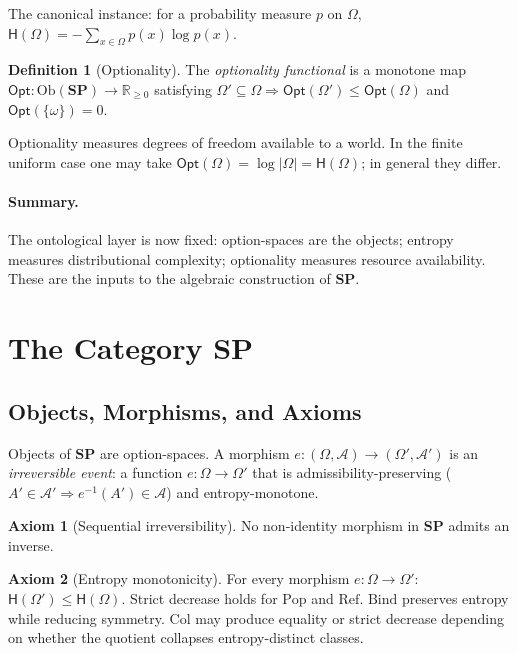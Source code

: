 \documentclass[12pt,a4paper]{article}
\theoremstyle{definition}
\newtheorem{definition}[theorem]{Definition}
\newtheorem{axiom}{Axiom}
\theoremstyle{remark}
\newcommand{\Rnn}{\mathbb{R}_{\ge 0}}
\newcommand{\Ent}{\mathsf{H}}
\newcommand{\Opt}{\mathsf{Opt}}
\newcommand{\SP}{\mathbf{SP}}
\newcommand{\Ob}{\mathrm{Ob}}
\newcommand{\Pop}{\mathrm{Pop}}
\newcommand{\Ref}{\mathrm{Ref}}
\newcommand{\Bind}{\mathrm{Bind}}
\newcommand{\Col}{\mathrm{Col}}
\begin{document}
The canonical instance: for a probability measure $p$ on $\Omega$,
$\Ent(\Omega)=-\sum_{x\in\Omega}p(x)\log p(x)$.

\begin{definition}[Optionality]
\label{def:opt}
The \emph{optionality functional} is a monotone map $\Opt:\Ob(\SP)\to\Rnn$
satisfying $\Omega'\subseteq\Omega\Rightarrow\Opt(\Omega')\le\Opt(\Omega)$ and
$\Opt(\{\omega\})=0$.
\end{definition}

Optionality measures degrees of freedom available to a world. In the finite uniform
case one may take $\Opt(\Omega)=\log|\Omega|=\Ent(\Omega)$; in general they differ.

\paragraph{Summary.} The ontological layer is now fixed: option-spaces are the objects;
entropy measures distributional complexity; optionality measures resource availability.
These are the inputs to the algebraic construction of $\SP$.

\section{The Category \texorpdfstring{$\SP$}{SP}}
\label{sec:sp}

\subsection{Objects, Morphisms, and Axioms}

Objects of $\SP$ are option-spaces. A morphism $e:(\Omega,\mathcal{A})\to
(\Omega',\mathcal{A}')$ is an \emph{irreversible event}: a function $e:\Omega\to\Omega'$
that is admissibility-preserving ($A'\in\mathcal{A}'\Rightarrow e^{-1}(A')\in\mathcal{A}$)
and entropy-monotone.

\begin{axiom}[Sequential irreversibility]
\label{ax:irrev}
No non-identity morphism in $\SP$ admits an inverse.
\end{axiom}

\begin{axiom}[Entropy monotonicity]
\label{ax:entropy}
For every morphism $e:\Omega\to\Omega'$: $\Ent(\Omega')\le\Ent(\Omega)$.
Strict decrease holds for $\Pop$ and $\Ref$. $\Bind$ preserves entropy while
reducing symmetry. $\Col$ may produce equality or strict decrease depending on
whether the quotient collapses entropy-distinct classes.
\end{axiom}
\end{document}
